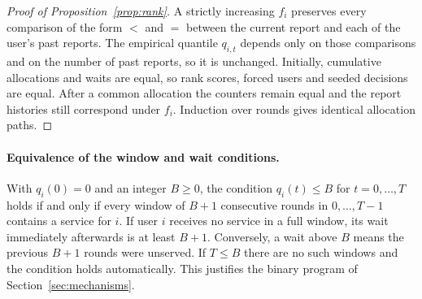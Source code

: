 \documentclass{article}
\theoremstyle{plain}
\theoremstyle{definition}
\begin{document}
\begin{proof}[Proof of Proposition~\ref{prop:rank}]
A strictly increasing $f_i$ preserves every comparison of the form $<$ and $=$ between the current report and each of the user's past reports.
The empirical quantile $q_{i,t}$ depends only on those comparisons and on the number of past reports, so it is unchanged.
Initially, cumulative allocations and waits are equal, so rank scores, forced users and seeded decisions are equal.
After a common allocation the counters remain equal and the report histories still correspond under $f_i$.
Induction over rounds gives identical allocation paths.
\end{proof}

\paragraph{Equivalence of the window and wait conditions.}
With $q_i(0)=0$ and an integer $B\ge 0$, the condition $q_i(t)\le B$ for $t=0,\dots,T$ holds if and only if every window of $B+1$ consecutive rounds in $0,\dots,T-1$ contains a service for $i$.
If user $i$ receives no service in a full window, its wait immediately afterwards is at least $B+1$.
Conversely, a wait above $B$ means the previous $B+1$ rounds were unserved.
If $T\le B$ there are no such windows and the condition holds automatically.
This justifies the binary program of Section~\ref{sec:mechanisms}.
\end{document}
